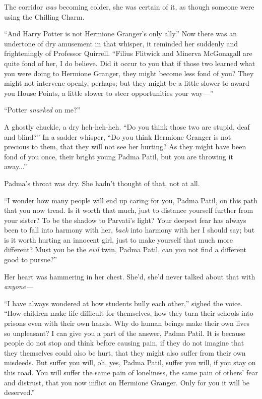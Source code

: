 The corridor \emph{was} becoming colder, she was certain of it, as though someone were using the Chilling Charm.

“And Harry Potter is not Hermione Granger’s only ally.” Now there was an undertone of dry amusement in that whisper, it reminded her suddenly and frighteningly of Professor Quirrell. “Filius Flitwick and Minerva McGonagall are quite fond of her, I do believe. Did it occur to you that if those two learned what you were doing to Hermione Granger, they might become less fond of you? They might not intervene openly, perhaps; but they might be a little slower to award you House Points, a little slower to steer opportunities your way—”

“Potter \emph{snarked} on me?”

A ghostly chuckle, a dry heh-heh-heh. “Do you think those two are stupid, deaf and blind?” In a sadder whisper, “Do you think Hermione Granger is not precious to them, that they will not see her hurting? As they might have been fond of you once, their bright young Padma Patil, but you are throwing it away...”

Padma’s throat was dry. She hadn’t thought of that, not at all.

“I wonder how many people will end up caring for you, Padma Patil, on this path that you now tread. Is it worth that much, just to distance yourself further from your sister? To be the shadow to Parvati’s light? Your deepest fear has always been to fall into harmony with her, \emph{back} into harmony with her I should say; but is it worth hurting an innocent girl, just to make yourself that much more different? Must you be the \emph{evil} twin, Padma Patil, can you not find a different good to pursue?”

Her heart was hammering in her chest. She’d, she’d never talked about that with \emph{anyone—}

“I have always wondered at how students bully each other,” sighed the voice. “How children make life difficult for themselves, how they turn their schools into prisons even with their own hands. Why do human beings make their own lives so unpleasant? I can give you a part of the answer, Padma Patil. It is because people do not stop and think before causing pain, if they do not imagine that they themselves could also be hurt, that they might also suffer from their own misdeeds. But suffer you will, oh, yes, Padma Patil, suffer you will, if you stay on this road. You will suffer the same pain of loneliness, the same pain of others’ fear and distrust, that you now inflict on Hermione Granger. Only for you it will be deserved.”

